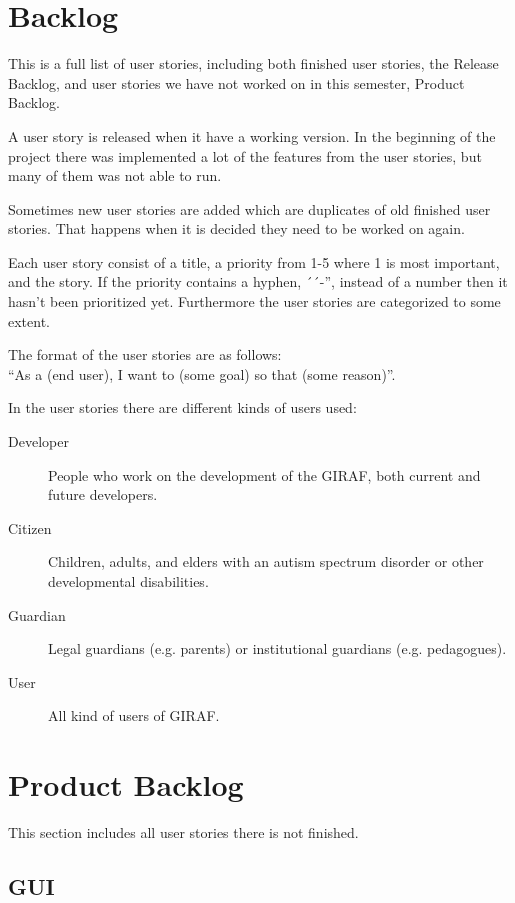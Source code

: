 \section{Backlog}\label{Appendix_secBacklog}
This is a full list of user stories, including both finished user stories, the Release Backlog, and user stories we have not worked on in this semester, Product Backlog.

A user story is released when it have a working version. In the beginning of the project there was implemented a lot of the features from the user stories, but many of them was not able to run.

Sometimes new user stories are added which are duplicates of old finished user stories. That happens when it is decided they need to be worked on again.

Each user story consist of a title, a priority from 1-5 where 1 is most important, and the story. If the priority contains a hyphen, ´´-'', instead of a number then it hasn't been prioritized yet.
Furthermore the user stories are categorized to some extent.

The format of the user stories are as follows: \\
``As a (end user), I want to (some goal) so that (some reason)''.

In the user stories there are different kinds of users used:
\begin{description}
	\item [Developer] People who work on the development of the GIRAF, both current and future developers.
	\item [Citizen] Children, adults, and elders with an autism spectrum disorder or other developmental disabilities.
	\item [Guardian] Legal guardians (e.g. parents) or institutional guardians (e.g. pedagogues).
	\item [User] All kind of users of GIRAF.
\end{description}

\section{Product Backlog}
This section includes all user stories there is not finished.

\subsection{GUI}

